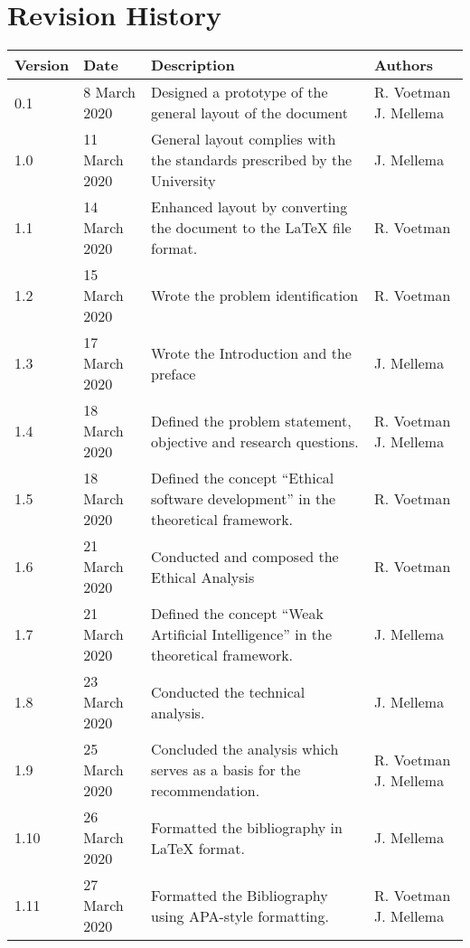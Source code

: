 \chapter*{Revision History}
\begin{center}
    \begin{tabularx}{\textwidth}{ | l | l | X | l | }
        \hline
        \textbf{Version}  & \textbf{Date}  & \textbf{Description}                                                    & \textbf{Authors} \\\hline
        0.1               & 8 March 2020   & Designed a prototype of the general layout of the document              & R. Voetman J. Mellema \\\hline
        1.0               & 11 March 2020  & General layout complies with the standards prescribed by the University & J. Mellema \\\hline
        1.1               & 14 March 2020  & Enhanced layout by converting the document to the LaTeX file format. & R. Voetman \\\hline
        1.2               & 15 March 2020  & Wrote the problem identification & R. Voetman \\\hline
        1.3               & 17 March 2020  & Wrote the Introduction and the preface & J. Mellema \\\hline
        1.4               & 18 March 2020  & Defined the problem statement, objective and research questions. & R. Voetman J. Mellema \\\hline
        1.5               & 18 March 2020  & Defined the concept “Ethical software development” in the theoretical framework. & R. Voetman \\\hline
        1.6               & 21 March 2020  & Conducted and composed the Ethical Analysis  & R. Voetman \\\hline
        1.7               & 21 March 2020  & Defined the concept “Weak Artificial Intelligence” in the theoretical framework. & J. Mellema \\\hline
        1.8               & 23 March 2020  & Conducted the technical analysis. & J. Mellema \\\hline
        1.9               & 25 March 2020  & Concluded the analysis which serves as a basis for the recommendation. & R. Voetman J. Mellema \\\hline
        1.10               & 26 March 2020  & Formatted the bibliography in LaTeX format. & J. Mellema \\\hline
        1.11               & 27 March 2020  & Formatted the Bibliography using APA-style formatting.
        & R. Voetman J. Mellema \\\hline

    \end{tabularx}
\end{center}
